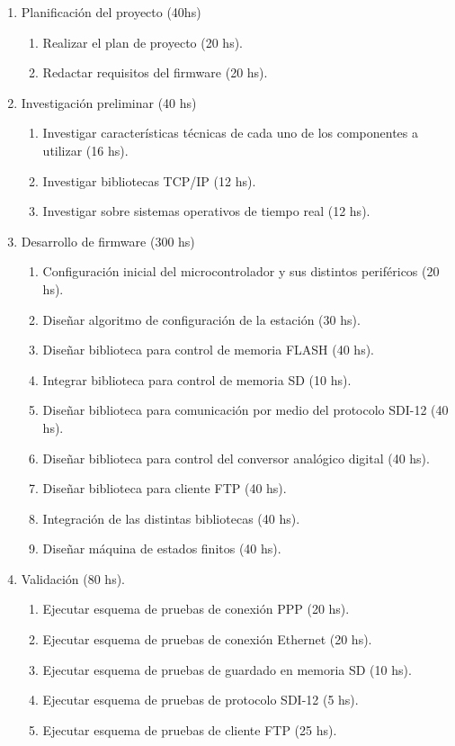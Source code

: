 \documentclass[
11pt, %
]{charter}
\begin{document}
\begin{enumerate}
\item Planificación del proyecto (40hs)
	\begin{enumerate}
	\item Realizar el plan de proyecto (20 hs).
	\item Redactar requisitos del firmware (20 hs).
	\end{enumerate}
\item Investigación preliminar (40 hs)
	\begin{enumerate}
	\item Investigar características técnicas de cada uno de los componentes a utilizar (16 hs).
	\item Investigar bibliotecas TCP/IP (12 hs).
	\item Investigar sobre sistemas operativos de tiempo real (12 hs).
	\end{enumerate}
\item Desarrollo de firmware (300 hs)
	\begin{enumerate}
	\item Configuración inicial del microcontrolador y sus distintos periféricos (20 hs). 
	\item Diseñar algoritmo de configuración de la estación (30 hs).
	\item Diseñar biblioteca para control de memoria FLASH (40 hs).
	\item Integrar biblioteca para control de memoria SD (10 hs).
	\item Diseñar biblioteca para comunicación por medio del protocolo SDI-12 (40 hs).
	\item Diseñar biblioteca para control del conversor analógico digital (40 hs).
	\item Diseñar biblioteca para cliente FTP (40 hs).
	\item Integración de las distintas bibliotecas (40 hs).
	\item Diseñar máquina de estados finitos (40 hs).
	\end{enumerate}
\item Validación (80 hs).
	\begin{enumerate}
	\item Ejecutar esquema de pruebas de conexión PPP (20 hs).
	\item Ejecutar esquema de pruebas de conexión Ethernet (20 hs).
	\item Ejecutar esquema de pruebas de guardado en memoria SD (10 hs).
	\item Ejecutar esquema de pruebas de protocolo SDI-12 (5 hs).
	\item Ejecutar esquema de pruebas de cliente FTP (25 hs).


\end{enumerate}
\end{enumerate}
\end{document}
